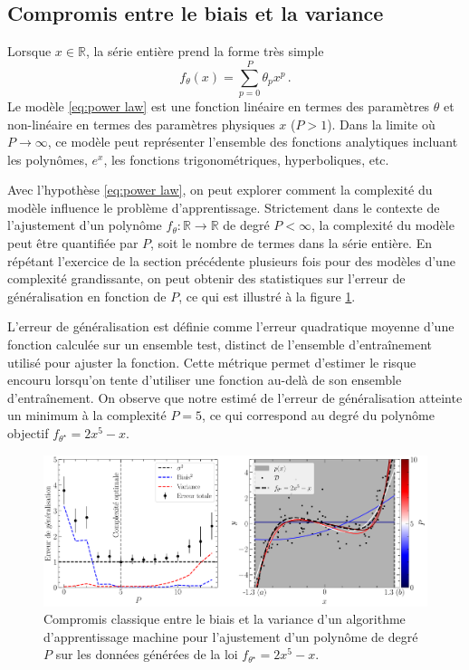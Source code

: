 \subsection{Compromis entre le biais et la variance}
Lorsque $x \in \mathbb{R}$, la série entière prend la forme très simple
\begin{equation}\label{eq:power law}
        f_\theta(x) = \sum_{p = 0}^{P} \theta_p x^{p}\, .
\end{equation} 
Le modèle \eqref{eq:power law} est une fonction linéaire en termes des paramètres $\theta$ et non-linéaire en termes des paramètres physiques $x$ ($P > 1$). 
Dans la limite où $P \rightarrow \infty$, ce modèle 
peut représenter l'ensemble des fonctions analytiques incluant les polynômes, $e^x$, les fonctions trigonométriques, hyperboliques, etc. 

Avec l'hypothèse \eqref{eq:power law}, on peut explorer comment la complexité du modèle influence le problème d'apprentissage. 
Strictement dans le contexte de l'ajustement 
d'un polynôme $f_\theta: \mathbb{R} \rightarrow \mathbb{R}$ de degré $P < \infty$, la complexité du modèle peut être quantifiée par $P$, soit le nombre de termes dans 
la série entière. En répétant l'exercice de la section précédente plusieurs fois pour des modèles d'une complexité grandissante,
on peut obtenir des statistiques sur l'erreur de généralisation en fonction de $P$, ce qui est illustré à la figure \ref{fig:bias_variance}.

L'erreur de généralisation est définie comme l'erreur quadratique moyenne d'une fonction calculée sur un ensemble test, distinct de l'ensemble d'entraînement 
utilisé pour ajuster la fonction.
Cette métrique permet d'estimer le risque encouru lorsqu'on tente d'utiliser une fonction au-delà de son ensemble d'entraînement.
On observe que notre estimé de l'erreur de généralisation atteinte un minimum à la complexité $P=5$, ce qui correspond au degré du polynôme objectif $f_{\theta^{\star}} = 2x^5 - x$. 

\begin{figure}[ht!]
        \centering
        \includegraphics[width=\textwidth]{notebooks/bias_variance.pdf}
        \caption{Compromis classique entre le biais et la variance d'un algorithme d'apprentissage machine pour l'ajustement d'un polynôme de degré $P$ sur les données générées de la 
        loi $f_{\theta^\star} = 2x^5 - x$.}
        \label{fig:bias_variance}
\end{figure}

